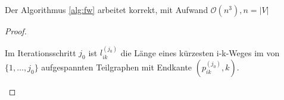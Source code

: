 \begin{theorem}
	Der Algorithmus \ref{alg:fw} arbeitet korrekt, mit Aufwand $\mathcal{O}(n^3), n=|V|$ 
\end{theorem}
\begin{proof}
\begin{notation}
Im Iterationsschritt $j_0$ ist $l_{ik}^{(j_0)}$ die Länge eines kürzesten i-k-Weges im von $\{1,\ldots,j_0\} $ aufgespannten Teilgraphen mit Endkante $(p_{ik}^{(j_0)},k)$. 
\end{notation}
\end{proof}
